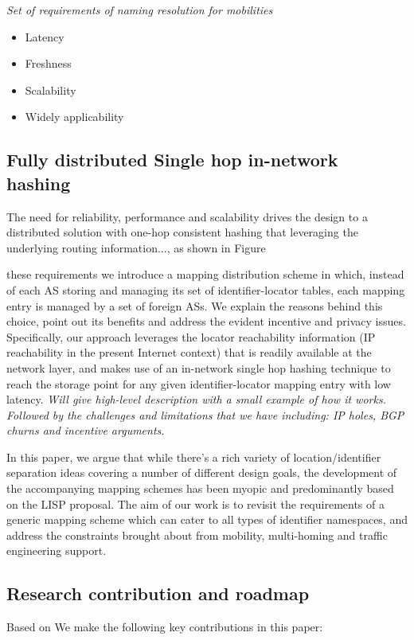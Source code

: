 \emph{Set of requirements of naming resolution for mobilities}
\begin{itemize}
    \item{Latency}
    \item{Freshness}
    \item{Scalability}
    \item{Widely applicability}
\end{itemize}

\subsection{Fully distributed Single hop in-network hashing}
The need for reliability, performance and scalability drives the design to a distributed solution with one-hop consistent hashing that leveraging the underlying routing information..., as shown in Figure

these requirements we introduce a mapping distribution scheme in which, instead of each AS storing and managing its set of identifier-locator tables, each mapping entry is managed by a set of foreign ASs. We explain the reasons behind this choice, point out its benefits and address the evident incentive and privacy issues. Specifically, our approach leverages the locator reachability information (IP reachability in the present Internet context) that is readily available at the network layer, and makes use of an in-network single hop hashing technique to reach the storage point for any given identifier-locator mapping entry with low latency.
\emph{Will give high-level description with a small example of how it works. Followed by the challenges and limitations that we have including: IP holes, BGP churns and incentive arguments.}

In this paper, we argue that while there's a rich variety of location/identifier separation ideas covering a number of different design goals, the development of the accompanying mapping schemes has been myopic and predominantly based on the LISP proposal. The aim of our work is to revisit the requirements of a generic mapping scheme which can cater to all types of identifier namespaces, and address the constraints brought about from mobility, multi-homing and traffic engineering support.

\subsection{Research contribution and roadmap}

Based on  
We make the following key contributions in this paper:


